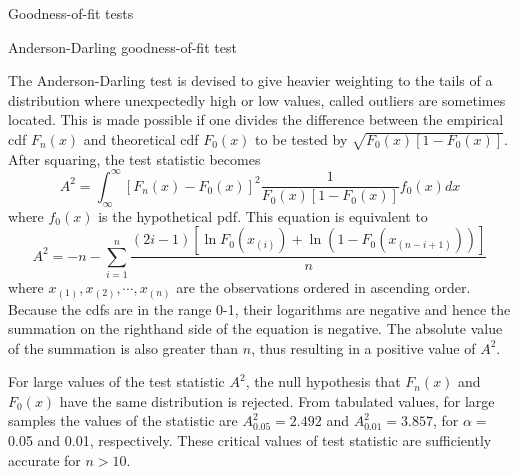 \documentclass[8pt]{beamer}
\renewcommand{\emph}[1]{\textcolor{myorange}{#1}}
\begin{document}
\begin{frame}{Goodness-of-fit tests}
    \begin{block}{Anderson-Darling goodness-of-fit test}
    \end{block}
    The \alert{Anderson-Darling test} is devised to give \emph{heavier weighting to the tails} of a distribution where unexpectedly high or low values, called outliers are sometimes located. This is made possible if one divides the difference between the \emph{empirical cdf} $F_n (x)$ and \emph{theoretical cdf} $F_0 (x)$ to be tested by $\sqrt{F_0 (x) [1- F_0 (x)]}$. After squaring, the test statistic becomes 
    \[
        A^2 = \int_{\infty}^{\infty} \left[ F_n (x) - F_0 (x) \right]^2 \frac{1}{F_0 (x) [ 1- F_0 (x)]} f_0 (x) dx
    \]
    where $f_0 (x)$ is the \emph{hypothetical pdf}. This equation is equivalent to
    \[
        A^2 = -n - \sum_{i=1}^n \frac{(2i-1) \left[ \ln F_0(x_{(i)})+\ln(1-F_0 (x_{(n-i+1)})) \right]}{n}
    \]
    where $x_{(1)}, x_{(2)}, \cdots, x_{(n)} $ are the observations ordered in ascending order. Because the \emph{cdfs} are in the range 0-1, their logarithms are negative and hence the summation on the righthand side of the equation is negative. The absolute value of the summation is also greater than $n$, thus resulting in a positive value of $A^2$.

    For large values of the test statistic $A^2$, the \emph{ null hypothesis} that $F_n (x)$ and $F_0 (x)$ have the same distribution is rejected. From tabulated values, for large samples the values of the statistic are $A_{0.05}^2 = 2.492$ and $A_{0.01}^2 = 3.857$, for $\alpha = $ 0.05 and 0.01, respectively. These critical values of test statistic are sufficiently accurate for $n>10$.  

        
   \end{frame}
\end{document}
